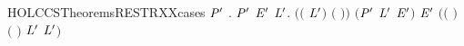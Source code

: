 \begin{SaveVerbatim}{HOLCCSTheoremsRESTRXXcases}
\HOLTokenTurnstile{} \HOLSymConst{\HOLTokenForall{}}\ensuremath{\HOLBoundVar{P}\sp{\prime{}}}   .
        \HOLTokenTransBegin{}\HOLTokenTransEnd \ensuremath{\HOLBoundVar{P}\sp{\prime{}}} \HOLSymConst{\HOLTokenImp{}}
     \HOLSymConst{\HOLTokenExists{}} \ensuremath{\HOLBoundVar{E}\sp{\prime{}}}  \ensuremath{\HOLBoundVar{L}\sp{\prime{}}}.
       \ensuremath{(}\ensuremath{(} \HOLSymConst{\ensuremath{=}} \ensuremath{\HOLBoundVar{L}\sp{\prime{}}}\ensuremath{)} \HOLSymConst{\HOLTokenConj{}} \ensuremath{(} \HOLSymConst{\ensuremath{=}} \ensuremath{)}\ensuremath{)} \HOLSymConst{\HOLTokenConj{}} \ensuremath{(}\ensuremath{\HOLBoundVar{P}\sp{\prime{}}} \HOLSymConst{\ensuremath{=}}  \ensuremath{\HOLBoundVar{L}\sp{\prime{}}} \ensuremath{\HOLBoundVar{E}\sp{\prime{}}}\ensuremath{)} \HOLSymConst{\HOLTokenConj{}}  \HOLTokenTransBegin{}\HOLTokenTransEnd \ensuremath{\HOLBoundVar{E}\sp{\prime{}}} \HOLSymConst{\HOLTokenConj{}}
       \ensuremath{(}\ensuremath{(} \HOLSymConst{\ensuremath{=}} \HOLConst{\ensuremath{\tau}}\ensuremath{)} \HOLSymConst{\HOLTokenDisj{}} \ensuremath{(} \HOLSymConst{\ensuremath{=}}  \ensuremath{)} \HOLSymConst{\HOLTokenConj{}}  \HOLConst{\HOLTokenNotIn{}} \ensuremath{\HOLBoundVar{L}\sp{\prime{}}} \HOLSymConst{\HOLTokenConj{}}   \HOLConst{\HOLTokenNotIn{}} \ensuremath{\HOLBoundVar{L}\sp{\prime{}}}\ensuremath{)}
\end{SaveVerbatim}
\newcommand{\HOLCCSTheoremsRESTRXXcases}{\UseVerbatim{HOLCCSTheoremsRESTRXXcases}}
